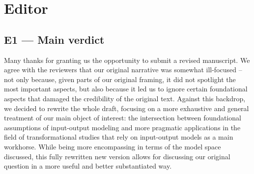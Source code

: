 \section*{Editor}

\subsection*{E1 --- Main verdict}

\response Many thanks for granting us the opportunity to submit a revised manuscript. We
agree with the reviewers that our original narrative was somewhat ill-focused
-- not only because, given parts of our original framing, it did not spotlight
the most important aspects, but also because it led us to ignore certain
foundational aspects that damaged the credibility of the original text.
Against this backdrop, we decided to rewrite the whole draft, focusing on a
more exhaustive and general treatment of our main object of interest: the
intersection between foundational assumptions of input-output modeling and
more pragmatic applications in the field of transformational studies that rely
on input-output models as a main workhorse. While being more encompassing in
terms of the model space discussed, this fully rewritten new version allows
for discussing our original question in a more useful and better substantiated
way.

